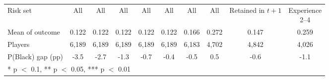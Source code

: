 \begin{table}[H]
{\begin{tabular}[t]{lccccccccc}
Risk set & All & All & All & All & All & All & All & \shortstack{Retained\\in $t+1$} & \shortstack{Experience\\2--4}\\
Mean of outcome & 0.122 & 0.122 & 0.122 & 0.122 & 0.122 & 0.166 & 0.272 & 0.147 & 0.259\\
Players & 6,189 & 6,189 & 6,189 & 6,189 & 6,189 & 6,183 & 4,702 & 4,842 & 4,026\\
P(Black) gap (pp) & -3.5 & -2.7 & -1.3 & -0.7 & -0.4 & -0.5 & 0.5 & -0.6 & -1.1\\
\bottomrule
\multicolumn{10}{l}{\rule{0pt}{1em}* p $<$ 0.1, ** p $<$ 0.05, *** p $<$ 0.01}\\
\end{tabular}}
\end{table}

